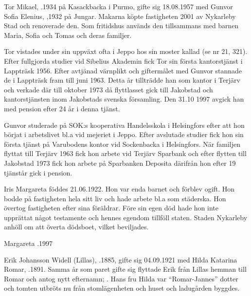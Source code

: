


Tor Mikael, .1934 på Kasackbacka i Purmo, gifte sig 18.08.1957 med Gunvor Sofia Elenius, ,1932 på Jungar. Makarna köpte fastigheten 2001 av Nykarleby Stad och renoverade den. Som fritidshus används den tillsammans med barnen Maria, Sofia och Tomas och deras familjer.

Tor vistades under sin uppväxt ofta i Jeppo hos sin moster  kallad (se nr 21, 321). Efter fullgjorda studier vid Sibelius Akademin fick Tor sin första kantorstjänst i Lappträsk 1956. Efter avtjänad värnplikt och giftermålet med Gunvor stannade de i Lappträsk fram till juni 1963. Detta år tillträdde han som kantor i Terjärv och verkade där till oktober 1973 då flyttlasset gick till Jakobstad och kantorstjänsten inom Jakobstads svenska församling. Den 31.10 1997 avgick han med pension efter 24 år i denna tjänst.

Gunvor studerade på SOK:s kooperativa Handelsskola i Helsingfors efter att hon börjat i arbetslivet bl.a vid mejeriet i Jeppo. Efter avslutade studier fick hon sin första tjänst på Varubodens kontor vid Sockenbacka i Helsingfors. När familjen flyttat till Terjärv 1963 fick hon arbete vid Terjärv Sparbank och efter flytten till Jakobstad 1973 fick hon arbete på Sparbanken Deposita därifrån hon efter 19 tjänstår gick i pension.


Iris Margareta föddes 21.06.1922. Hon var enda barnet och förblev ogift. Hon bodde på fastigheten hela sitt liv och hade arbete bl.a som städerska. Hon övertog fastigheten efter sina föräldrar. Före sin egen död hade hon inte upprättat något testamente och hennes egendom tillföll staten. Staden Nykarleby anhöll om att överta dödsboet, vilket beviljades.

Margareta .1997


Erik Johansson Widell (Lillas), .1885, gifte sig 04.09.1921 med Hilda Katarina Romar, .1891. Samma år som paret gifte sig flyttade Erik från Lillas hemman till Romar och antog nytt efternamn; . Hans fru Hilda var ``Romar-Jannes'' dotter och tomten utbröts nu från stomlägenheten och huset och ladugården byggdes.

